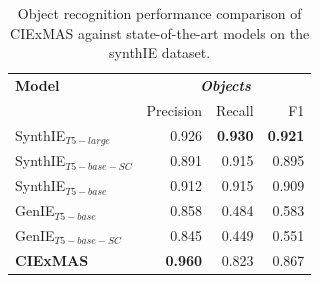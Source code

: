 \documentclass[a4paper,oneside,bibliography=totoc]{scrbook}
\begin{document}
\begin{table}[h]
  \centering
  \begin{tabular}{l|rrr}
    \toprule
    \textbf{Model}         & \multicolumn{3}{c}{\textit{\textbf{Objects}}}                                   \\
                           & Precision                                     & Recall         & F1             \\
    \midrule
    SynthIE$_{T5-large}$   & 0.926                                         & \textbf{0.930} & \textbf{0.921} \\
    SynthIE$_{T5-base-SC}$ & 0.891                                         & 0.915          & 0.895          \\
    SynthIE$_{T5-base}$    & 0.912                                         & 0.915          & 0.909          \\
    GenIE$_{T5-base}$      & 0.858                                         & 0.484          & 0.583          \\
    GenIE$_{T5-base-SC}$   & 0.845                                         & 0.449          & 0.551          \\
    \midrule
    \textbf{CIExMAS}       & \textbf{0.960}                                & 0.823          & 0.867          \\
    \bottomrule
  \end{tabular}
  \caption{Object recognition performance comparison of CIExMAS against state-of-the-art models on the synthIE dataset.}
  \label{tab:evaluation_objects}
\end{table}
\end{document}
